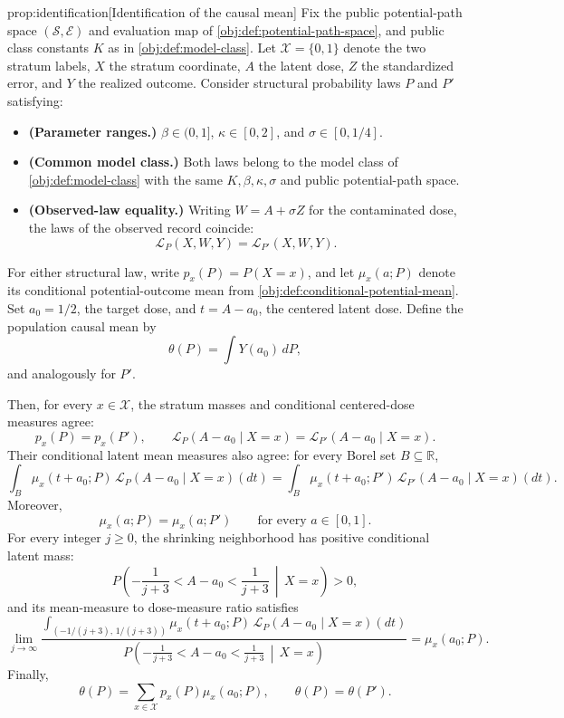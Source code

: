 \begin{propositionv}{prop:identification}[Identification of the causal mean]
Fix the public potential-path space \((\mathcal S,\mathcal E)\) and evaluation map of \cref{obj:def:potential-path-space}, and public class constants \(K\) as in \cref{obj:def:model-class}. Let \(\mathcal X=\{0,1\}\) denote the two stratum labels, \(X\) the stratum coordinate, \(A\) the latent dose, \(Z\) the standardized error, and \(Y\) the realized outcome. Consider structural probability laws \(P\) and \(P'\) satisfying:
\begin{itemize}
\item \textbf{(Parameter ranges.)} \(\beta\in(0,1]\), \(\kappa\in[0,2]\), and \(\sigma\in[0,1/4]\).
\item \textbf{(Common model class.)} Both laws belong to the model class of \cref{obj:def:model-class} with the same \(K,\beta,\kappa,\sigma\) and public potential-path space.
\item \textbf{(Observed-law equality.)} Writing \(W=A+\sigma Z\) for the contaminated dose, the laws of the observed record coincide:
\[
\mathcal L_P(X,W,Y)=\mathcal L_{P'}(X,W,Y).
\]
\end{itemize}
For either structural law, write \(p_x(P)=P(X=x)\), and let \(\mu_x(a;P)\) denote its conditional potential-outcome mean from \cref{obj:def:conditional-potential-mean}. Set \(a_0=1/2\), the target dose, and \(t=A-a_0\), the centered latent dose. Define the population causal mean by
\[
\theta(P)=\int Y(a_0)\,dP,
\]
and analogously for \(P'\).

Then, for every \(x\in\mathcal X\), the stratum masses and conditional centered-dose measures agree:
\[
p_x(P)=p_x(P'),
\qquad
\mathcal L_P(A-a_0\mid X=x)
=
\mathcal L_{P'}(A-a_0\mid X=x).
\]
Their conditional latent mean measures also agree: for every Borel set \(B\subseteq\mathbb R\),
\[
\int_B \mu_x(t+a_0;P)\,
        \mathcal L_P(A-a_0\mid X=x)(dt)
=
\int_B \mu_x(t+a_0;P')\,
        \mathcal L_{P'}(A-a_0\mid X=x)(dt).
\]
Moreover,
\[
\mu_x(a;P)=\mu_x(a;P')
\qquad\text{for every }a\in[0,1].
\]
For every integer \(j\ge0\), the shrinking neighborhood has positive conditional latent mass:
\[
P\!\left(
-\frac1{j+3}<A-a_0<\frac1{j+3}
\,\middle|\,X=x
\right)>0,
\]
and its mean-measure to dose-measure ratio satisfies
\[
\lim_{j\to\infty}
\frac{
\displaystyle
\int_{(-1/(j+3),\,1/(j+3))}
\mu_x(t+a_0;P)\,
\mathcal L_P(A-a_0\mid X=x)(dt)
}{
\displaystyle
P\!\left(
-\frac1{j+3}<A-a_0<\frac1{j+3}
\,\middle|\,X=x
\right)
}
=
\mu_x(a_0;P).
\]
Finally,
\[
\theta(P)
=
\sum_{x\in\mathcal X}p_x(P)\mu_x(a_0;P),
\qquad
\theta(P)=\theta(P').
\]
\end{propositionv}

